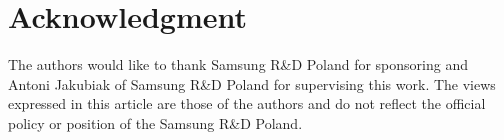 \section*{Acknowledgment}
The authors would like to thank
Samsung R\&D Poland for sponsoring and Antoni Jakubiak of Samsung R\&D Poland for supervising
this work. The views expressed in this article are those of the
authors and do not reflect the official policy or position of
the Samsung R\&D Poland.
